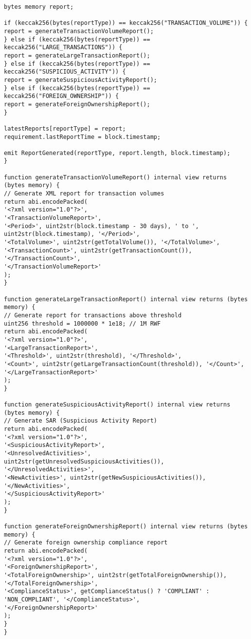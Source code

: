 \documentclass[12pt]{article}
\begin{document}
{{{\begin{lstlisting}
bytes memory report;

if (keccak256(bytes(reportType)) == keccak256("TRANSACTION_VOLUME")) {
report = generateTransactionVolumeReport();
} else if (keccak256(bytes(reportType)) == keccak256("LARGE_TRANSACTIONS")) {
report = generateLargeTransactionReport();
} else if (keccak256(bytes(reportType)) == keccak256("SUSPICIOUS_ACTIVITY")) {
report = generateSuspiciousActivityReport();
} else if (keccak256(bytes(reportType)) == keccak256("FOREIGN_OWNERSHIP")) {
report = generateForeignOwnershipReport();
}

latestReports[reportType] = report;
requirement.lastReportTime = block.timestamp;

emit ReportGenerated(reportType, report.length, block.timestamp);
}

function generateTransactionVolumeReport() internal view returns (bytes memory) {
// Generate XML report for transaction volumes
return abi.encodePacked(
'<?xml version="1.0"?>',
'<TransactionVolumeReport>',
'<Period>', uint2str(block.timestamp - 30 days), ' to ', uint2str(block.timestamp), '</Period>',
'<TotalVolume>', uint2str(getTotalVolume()), '</TotalVolume>',
'<TransactionCount>', uint2str(getTransactionCount()), '</TransactionCount>',
'</TransactionVolumeReport>'
);
}

function generateLargeTransactionReport() internal view returns (bytes memory) {
// Generate report for transactions above threshold
uint256 threshold = 1000000 * 1e18; // 1M RWF
return abi.encodePacked(
'<?xml version="1.0"?>',
'<LargeTransactionReport>',
'<Threshold>', uint2str(threshold), '</Threshold>',
'<Count>', uint2str(getLargeTransactionCount(threshold)), '</Count>',
'</LargeTransactionReport>'
);
}

function generateSuspiciousActivityReport() internal view returns (bytes memory) {
// Generate SAR (Suspicious Activity Report)
return abi.encodePacked(
'<?xml version="1.0"?>',
'<SuspiciousActivityReport>',
'<UnresolvedActivities>', uint2str(getUnresolvedSuspiciousActivities()), '</UnresolvedActivities>',
'<NewActivities>', uint2str(getNewSuspiciousActivities()), '</NewActivities>',
'</SuspiciousActivityReport>'
);
}

function generateForeignOwnershipReport() internal view returns (bytes memory) {
// Generate foreign ownership compliance report
return abi.encodePacked(
'<?xml version="1.0"?>',
'<ForeignOwnershipReport>',
'<TotalForeignOwnership>', uint2str(getTotalForeignOwnership()), '</TotalForeignOwnership>',
'<ComplianceStatus>', getComplianceStatus() ? 'COMPLIANT' : 'NON_COMPLIANT', '</ComplianceStatus>',
'</ForeignOwnershipReport>'
);
}
}
\end{lstlisting}

}}}
\end{document}
